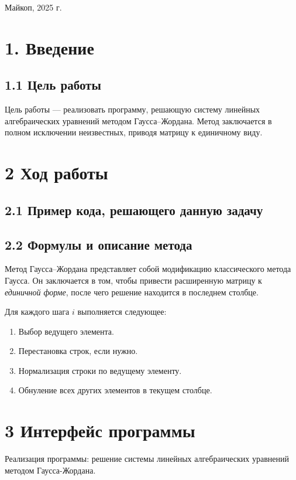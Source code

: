 \documentclass[a4paper,12pt]{article}
\newcommand{\centered}[1]{\begin{center}#1\end{center}}
\begin{document}
\vspace*{\fill}

\centered{
Майкоп, 2025 г.
}
\newpage


\section*{1. Введение}
\subsection*{1.1 Цель работы}
Цель работы — реализовать программу, решающую систему линейных алгебраических уравнений методом Гаусса–Жордана. Метод заключается в полном исключении неизвестных, приводя матрицу к единичному виду.

\section*{2 Ход работы}
\subsection*{2.1 Пример кода, решающего данную задачу}

\subsection*{2.2 Формулы и описание метода}
Метод Гаусса–Жордана представляет собой модификацию классического метода Гаусса. Он заключается в том, чтобы привести расширенную матрицу к \textit{единичной форме}, после чего решение находится в последнем столбце.

Для каждого шага $ i $ выполняется следующее:
\begin{enumerate}
    \item Выбор ведущего элемента.
    \item Перестановка строк, если нужно.
    \item Нормализация строки по ведущему элементу.
    \item Обнуление всех других элементов в текущем столбце.
\end{enumerate}

\section*{3 Интерфейс программы}
 Реализация программы: решение системы линейных алгебраических уравнений методом Гаусса-Жордана.
\end{document}
